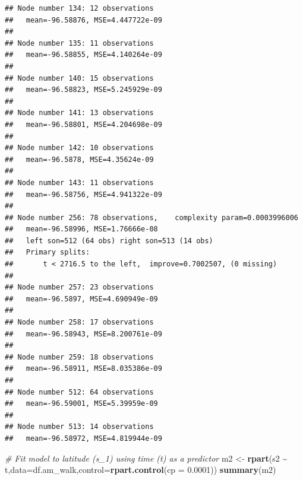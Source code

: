 \documentclass[
]{book}
\newenvironment{Shaded}{\begin{snugshade}}{\end{snugshade}}
\newcommand{\AttributeTok}[1]{\textcolor[rgb]{0.13,0.29,0.53}{#1}}
\newcommand{\CommentTok}[1]{\textcolor[rgb]{0.56,0.35,0.01}{\textit{#1}}}
\newcommand{\FloatTok}[1]{\textcolor[rgb]{0.00,0.00,0.81}{#1}}
\newcommand{\FunctionTok}[1]{\textcolor[rgb]{0.13,0.29,0.53}{\textbf{#1}}}
\newcommand{\NormalTok}[1]{#1}
\newcommand{\OtherTok}[1]{\textcolor[rgb]{0.56,0.35,0.01}{#1}}
\newcommand{\SpecialCharTok}[1]{\textcolor[rgb]{0.81,0.36,0.00}{\textbf{#1}}}
\begin{document}
\begin{verbatim}
## Node number 134: 12 observations
##   mean=-96.58876, MSE=4.447722e-09 
## 
## Node number 135: 11 observations
##   mean=-96.58855, MSE=4.140264e-09 
## 
## Node number 140: 15 observations
##   mean=-96.58823, MSE=5.245929e-09 
## 
## Node number 141: 13 observations
##   mean=-96.58801, MSE=4.204698e-09 
## 
## Node number 142: 10 observations
##   mean=-96.5878, MSE=4.35624e-09 
## 
## Node number 143: 11 observations
##   mean=-96.58756, MSE=4.941322e-09 
## 
## Node number 256: 78 observations,    complexity param=0.0003996006
##   mean=-96.58996, MSE=1.76666e-08 
##   left son=512 (64 obs) right son=513 (14 obs)
##   Primary splits:
##       t < 2716.5 to the left,  improve=0.7002507, (0 missing)
## 
## Node number 257: 23 observations
##   mean=-96.5897, MSE=4.690949e-09 
## 
## Node number 258: 17 observations
##   mean=-96.58943, MSE=8.200761e-09 
## 
## Node number 259: 18 observations
##   mean=-96.58911, MSE=8.035386e-09 
## 
## Node number 512: 64 observations
##   mean=-96.59001, MSE=5.39959e-09 
## 
## Node number 513: 14 observations
##   mean=-96.58972, MSE=4.819944e-09
\end{verbatim}

\begin{Shaded}
\begin{Highlighting}[]
\CommentTok{\# Fit model to latitude (s\_1) using time (t) as a predictor}
\NormalTok{m2 }\OtherTok{\textless{}{-}} \FunctionTok{rpart}\NormalTok{(s2 }\SpecialCharTok{\textasciitilde{}}\NormalTok{ t,}\AttributeTok{data=}\NormalTok{df.am\_walk,}\AttributeTok{control=}\FunctionTok{rpart.control}\NormalTok{(}\AttributeTok{cp =} \FloatTok{0.0001}\NormalTok{))}
\FunctionTok{summary}\NormalTok{(m2)}
\end{Highlighting}
\end{Shaded}
\end{document}
